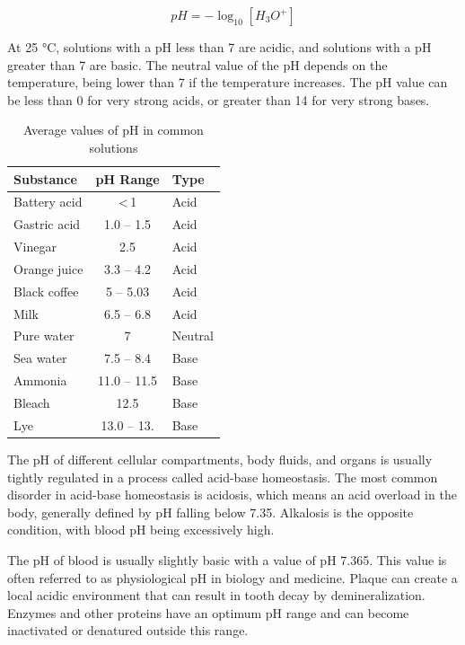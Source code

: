 \[pH = - \log_{10} [H_3O^+]\]

At 25 °C, solutions with a pH less than 7 are acidic, and solutions with a pH greater than 7 are basic. The neutral value of the pH depends on the temperature, being lower than 7 if the temperature increases. The pH value can be less than 0 for very strong acids, or greater than 14 for very strong bases.

\begin{table}[!h]

\caption{\label{tab:solutions}Average values of pH in common solutions}
\centering
\begin{tabular}[t]{lcl}
\toprule
Substance & pH Range & Type\\
\midrule
\rowcolor{gray!6}  Battery acid & < 1 & Acid\\
Gastric acid & 1.0 – 1.5 & Acid\\
\rowcolor{gray!6}  Vinegar & 2.5 & Acid\\
Orange juice & 3.3 – 4.2 & Acid\\
\rowcolor{gray!6}  Black coffee & 5 – 5.03 & Acid\\
\addlinespace
Milk & 6.5 – 6.8 & Acid\\
\rowcolor{gray!6}  Pure water & 7 & Neutral\\
Sea water & 7.5 – 8.4 & Base\\
\rowcolor{gray!6}  Ammonia & 11.0 – 11.5 & Base\\
Bleach & 12.5 & Base\\
\addlinespace
\rowcolor{gray!6}  Lye & 13.0 – 13. & Base\\
\bottomrule
\end{tabular}
\end{table}

The pH of different cellular compartments, body fluids, and organs is usually tightly regulated in a process called acid-base homeostasis. The most common disorder in acid-base homeostasis is acidosis, which means an acid overload in the body, generally defined by pH falling below 7.35. Alkalosis is the opposite condition, with blood pH being excessively high.

The pH of blood is usually slightly basic with a value of pH 7.365. This value is often referred to as physiological pH in biology and medicine. Plaque can create a local acidic environment that can result in tooth decay by demineralization. Enzymes and other proteins have an optimum pH range and can become inactivated or denatured outside this range.

